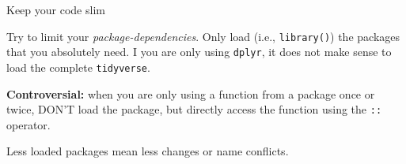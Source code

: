 \documentclass{beamer}\usepackage[]{graphicx}\usepackage[]{color}
\makeatletter
\newcommand{\hlnum}[1]{\textcolor[rgb]{0.502,0,0.502}{\textbf{#1}}}%
\newcommand{\hlcom}[1]{\textcolor[rgb]{1,0.502,0}{#1}}%
\newcommand{\hlopt}[1]{\textcolor[rgb]{1,0,0.502}{\textbf{#1}}}%
\newcommand{\hlstd}[1]{\textcolor[rgb]{0,0,0}{#1}}%
\newcommand{\hlkwb}[1]{\textcolor[rgb]{0.502,0.502,0.753}{\textbf{#1}}}%
\newcommand{\hlkwc}[1]{\textcolor[rgb]{0,0.502,0.753}{#1}}%
\newcommand{\hlkwd}[1]{\textcolor[rgb]{0,0.267,0.4}{#1}}%
\newenvironment{kframe}{%
 \def\at@end@of@kframe{}%
 \ifinner\ifhmode%
  \def\at@end@of@kframe{\end{minipage}}%
  \begin{minipage}{\columnwidth}%
 \fi\fi%
 \def\FrameCommand##1{\hskip\@totalleftmargin \hskip-\fboxsep
 \colorbox{shadecolor}{##1}\hskip-\fboxsep
     \hskip-\linewidth \hskip-\@totalleftmargin \hskip\columnwidth}%
 \MakeFramed {\advance\hsize-\width
   \@totalleftmargin\z@ \linewidth\hsize
   \@setminipage}}%
 {\par\unskip\endMakeFramed%
 \at@end@of@kframe}
\newenvironment{knitrout}{}{} %
\makeatother
\begin{document}



\begin{frame}[fragile]{Keep your code slim}

Try to limit your \emph{package-dependencies}. Only load (i.e., \texttt{library()}) the packages that you absolutely need. I you are only using \texttt{dplyr}, it does not make sense to load the complete \texttt{tidyverse}.

\textbf{Controversial:} when you are only using a function from a package once or twice, DON'T load the package, but directly access the function using the \texttt{::} operator.

Less loaded packages mean less changes or name conflicts.

\end{frame}
\end{document}
